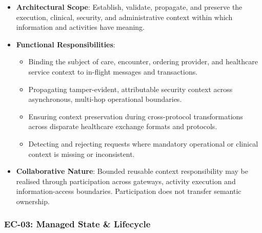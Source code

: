 \begin{itemize}

\item 
\textbf{Architectural Scope}: Establish, validate, propagate, and preserve the execution, clinical, security, and administrative context within which information and activities have meaning.



\item 
\textbf{Functional Responsibilities}:


\begin{itemize}

\item 
Binding the subject of care, encounter, ordering provider, and healthcare service context to in-flight messages and transactions.



\item 
Propagating tamper-evident, attributable security context across asynchronous, multi-hop operational boundaries.



\item 
Ensuring context preservation during cross-protocol transformations across disparate healthcare exchange formats and protocols.



\item 
Detecting and rejecting requests where mandatory operational or clinical context is missing or inconsistent.



\end{itemize}


\item 
\textbf{Collaborative Nature}: Bounded reusable context responsibility may be realised through participation across gateways, activity execution and information-access boundaries. Participation does not transfer semantic ownership.



\end{itemize}
\label{rad:enterprise:121}
\subsubsection*{EC-03: Managed State \& Lifecycle}
\label{rad:enterprise:122}

